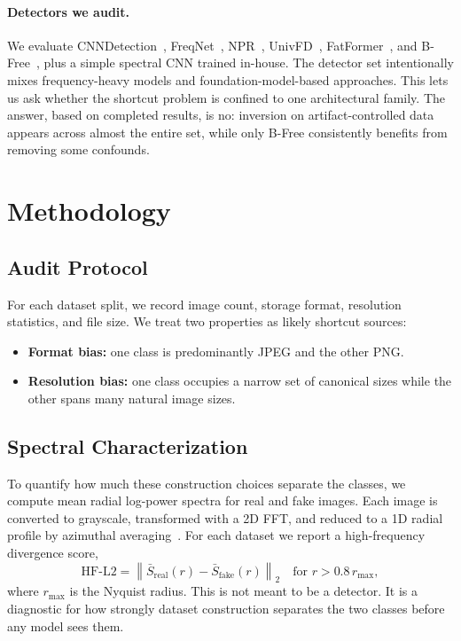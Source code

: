 \documentclass{article}
\begin{document}
\paragraph{Detectors we audit.}
We evaluate CNNDetection~\cite{wang2020cnn}, FreqNet~\cite{freqnet}, NPR~\cite{npr}, UnivFD~\cite{univfd}, FatFormer~\cite{fatformer}, and B-Free~\cite{bfree}, plus a simple spectral CNN trained in-house.
The detector set intentionally mixes frequency-heavy models and foundation-model-based approaches.
This lets us ask whether the shortcut problem is confined to one architectural family.
The answer, based on completed results, is no: inversion on artifact-controlled data appears across almost the entire set, while only B-Free consistently benefits from removing some confounds.


\section{Methodology}
\label{sec:method}

\subsection{Audit Protocol}

For each dataset split, we record image count, storage format, resolution statistics, and file size. We treat two properties as likely shortcut sources:
\begin{itemize}[itemsep=2pt,topsep=2pt]
  \item \textbf{Format bias:} one class is predominantly JPEG and the other PNG.
  \item \textbf{Resolution bias:} one class occupies a narrow set of canonical sizes while the other spans many natural image sizes.
\end{itemize}

\subsection{Spectral Characterization}

To quantify how much these construction choices separate the classes, we compute mean radial log-power spectra for real and fake images.
Each image is converted to grayscale, transformed with a 2D FFT, and reduced to a 1D radial profile by azimuthal averaging~\cite{durall2020watch}.
For each dataset we report a high-frequency divergence score,
\[
\mathrm{HF\text{-}L2} = \left\lVert \bar{S}_{\mathrm{real}}(r) - \bar{S}_{\mathrm{fake}}(r) \right\rVert_2
\quad \text{for } r > 0.8\,r_{\max},
\]
where $r_{\max}$ is the Nyquist radius. This is not meant to be a detector. It is a diagnostic for how strongly dataset construction separates the two classes before any model sees them.
\end{document}
